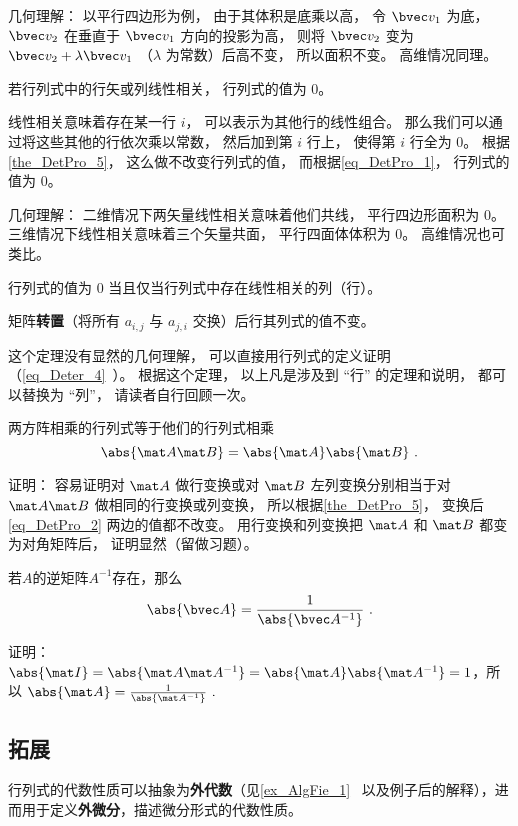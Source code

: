 几何理解： 以平行四边形为例， 由于其体积是底乘以高， 令 $\bvec v_1$ 为底， $\bvec v_2$ 在垂直于 $\bvec v_1$ 方向的投影为高， 则将 $\bvec v_2$ 变为 $\bvec v_2 + \lambda \bvec v_1$ （$\lambda$ 为常数）后高不变， 所以面积不变。 高维情况同理。

\begin{theorem}{ }\label{the_DetPro_9}
若行列式中的行矢或列线性相关， 行列式的值为 0。
\end{theorem}
线性相关意味着存在某一行 $i$， 可以表示为其他行的线性组合。 那么我们可以通过将这些其他的行依次乘以常数， 然后加到第 $i$ 行上， 使得第 $i$ 行全为 0。 根据\autoref{the_DetPro_5}， 这么做不改变行列式的值， 而根据\autoref{eq_DetPro_1}， 行列式的值为 0。

几何理解： 二维情况下两矢量线性相关意味着他们共线， 平行四边形面积为 0。 三维情况下线性相关意味着三个矢量共面， 平行四面体体积为 0。 高维情况也可类比。

\begin{theorem}{ } \label{the_DetPro_2}
行列式的值为 0 当且仅当行列式中存在线性相关的列（行）。
\end{theorem}

\begin{theorem}{ }\label{the_DetPro_7}
矩阵\textbf{转置}（将所有 $a_{i,j}$ 与 $a_{j,i}$ 交换）后行其列式的值不变。
\end{theorem}
这个定理没有显然的几何理解， 可以直接用行列式的定义证明（\autoref{eq_Deter_4}~）。 根据这个定理， 以上凡是涉及到 “行” 的定理和说明， 都可以替换为 “列”， 请读者自行回顾一次。

\begin{theorem}{}\label{the_DetPro_8}
两方阵相乘的行列式等于他们的行列式相乘
\begin{equation}\label{eq_DetPro_2}
\abs{\mat A \mat B} = \abs{\mat A}\abs{\mat B}~.
\end{equation}
\end{theorem}
证明： 容易证明对 $\mat A$ 做行变换或对 $\mat B$ 左列变换分别相当于对 $\mat A\mat B$ 做相同的行变换或列变换， 所以根据\autoref{the_DetPro_5}， 变换后\autoref{eq_DetPro_2} 两边的值都不改变。 用行变换和列变换把 $\mat A$ 和 $\mat B$ 都变为对角矩阵后， 证明显然（留做习题）。

\begin{theorem}{}
若$A$的逆矩阵$A^{-1}$存在，那么
\begin{equation}
\abs{\bvec A}=\frac{1}{\abs{\bvec A^{-1}}}~.
\end{equation}
\end{theorem}
证明：
$\abs{\mat I} = \abs{\mat A \mat A^{-1}} = \abs{\mat A}\abs{\mat A^{-1}}=1$，所以
$\abs{\mat A}=\frac{1}{\abs{\mat A^{-1}}}~.$

\subsection{拓展}

行列式的代数性质可以抽象为\textbf{外代数}（见\autoref{ex_AlgFie_1}~ 以及例子后的解释），进而用于定义\textbf{外微分}，描述微分形式的代数性质。
